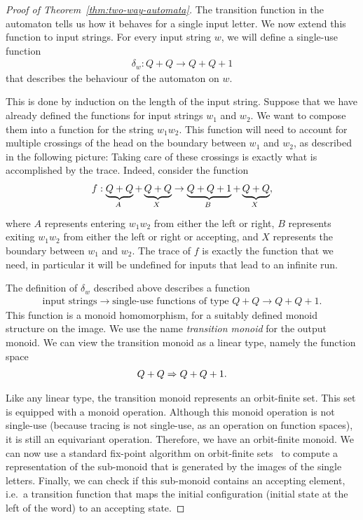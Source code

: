 \begin{proof}[Proof of Theorem~\ref{thm:two-way-automata}]
    The transition function in the automaton tells us how it behaves for a single input letter. We now extend this function to input strings.    For every input string $w$, we will define  a single-use function 
    \begin{align*}
       \delta_w :  Q+Q \to Q + Q + 1
    \end{align*}
    that describes the behaviour of the automaton on $w$. 
    
    This is done by induction on the length of the input string. Suppose that we have already defined the functions for  input strings $w_1$ and $w_2$.
    We want to compose them into a function for the string $w_1 w_2$. This function will need to account for multiple crossings of the head on the boundary between $w_1$ and $w_2$, as described in the following picture: 
    Taking care of these crossings is exactly what is accomplished by the trace. Indeed, consider the function 
        \begin{align*}
            f : \myunderbrace{Q+Q}{$A$} + \myunderbrace{Q+Q}{$X$} \to \myunderbrace{Q+Q + 1}{$B$} + \myunderbrace{Q+Q}{$X$},
        \end{align*}
        where $A$ represents entering $w_1 w_2$ from either the left or right, $B$ represents exiting $w_1 w_2$ from either the left or right or accepting,  and $X$ represents the boundary between $w_1$ and $w_2$. The trace of $f$ is exactly the function that we need, in particular it will be undefined for inputs that lead to an infinite run.


        The definition of $\delta_w$ described above describes a function 
        \begin{align*}
        \text{input strings} \to \text{single-use functions of type }Q+Q \to Q + Q + 1.
        \end{align*}
        This function is a monoid homomorphism, for a suitably defined  monoid structure on the image. We use the name \emph{transition monoid} for the output monoid. We can view the transition monoid  as a linear type, namely the function space 
        \begin{align*}
        Q+Q \Rightarrow Q + Q + 1.
        \end{align*}

        Like any linear type, the transition monoid represents an orbit-finite set. This set is equipped with a monoid operation. Although this monoid operation is not single-use (because tracing is not single-use, as an operation on function spaces), it is still an equivariant operation. Therefore, we have an orbit-finite monoid. We can now use a standard fix-point algorithm on orbit-finite sets~\cite{bojanczyk_slightly2018} to compute a representation of the sub-monoid that is generated by the images of the single letters. Finally, we can check if this sub-monoid contains an accepting element, i.e.~a transition function that maps the initial configuration (initial state at the left of the word) to an accepting state. 
\end{proof}

